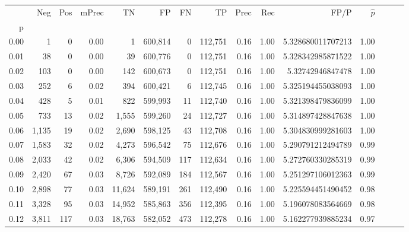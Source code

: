 \begin{tabular}{rrrrrrrrrrrrrrr}
\toprule
{} &     Neg &    Pos & mPrec &       TN &       FP &       FN &       TP &  Prec &   Rec &                    FP/P & $\hat{p}$ \\
p    &         &        &       &          &          &          &          &       &       &                         &           \\
\midrule
0.00 &       1 &      0 &  0.00 &        1 &  600,814 &        0 &  112,751 &  0.16 &  1.00 &       5.328680011707213 &      1.00 \\
0.01 &      38 &      0 &  0.00 &       39 &  600,776 &        0 &  112,751 &  0.16 &  1.00 &       5.328342985871522 &      1.00 \\
0.02 &     103 &      0 &  0.00 &      142 &  600,673 &        0 &  112,751 &  0.16 &  1.00 &        5.32742946847478 &      1.00 \\
0.03 &     252 &      6 &  0.02 &      394 &  600,421 &        6 &  112,745 &  0.16 &  1.00 &       5.325194455038093 &      1.00 \\
0.04 &     428 &      5 &  0.01 &      822 &  599,993 &       11 &  112,740 &  0.16 &  1.00 &       5.321398479836099 &      1.00 \\
0.05 &     733 &     13 &  0.02 &    1,555 &  599,260 &       24 &  112,727 &  0.16 &  1.00 &       5.314897428847638 &      1.00 \\
0.06 &   1,135 &     19 &  0.02 &    2,690 &  598,125 &       43 &  112,708 &  0.16 &  1.00 &       5.304830999281603 &      1.00 \\
0.07 &   1,583 &     32 &  0.02 &    4,273 &  596,542 &       75 &  112,676 &  0.16 &  1.00 &       5.290791212494789 &      0.99 \\
0.08 &   2,033 &     42 &  0.02 &    6,306 &  594,509 &      117 &  112,634 &  0.16 &  1.00 &       5.272760330285319 &      0.99 \\
0.09 &   2,420 &     67 &  0.03 &    8,726 &  592,089 &      184 &  112,567 &  0.16 &  1.00 &       5.251297106012363 &      0.99 \\
0.10 &   2,898 &     77 &  0.03 &   11,624 &  589,191 &      261 &  112,490 &  0.16 &  1.00 &       5.225594451490452 &      0.98 \\
0.11 &   3,328 &     95 &  0.03 &   14,952 &  585,863 &      356 &  112,395 &  0.16 &  1.00 &       5.196078083564669 &      0.98 \\
0.12 &   3,811 &    117 &  0.03 &   18,763 &  582,052 &      473 &  112,278 &  0.16 &  1.00 &       5.162277939885234 &      0.97 \\

\end{tabular}
